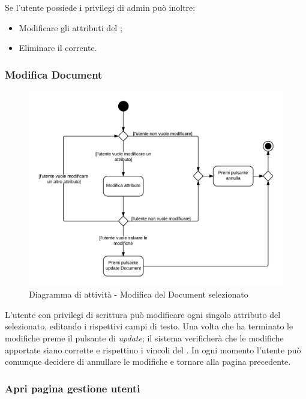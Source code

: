 Se l'utente possiede i privilegi di admin può inoltre:

\begin{itemize}

	\item Modificare gli attributi del ;
	\item Eliminare il  corrente.

\end{itemize}

\subsubsection{Modifica Document}

\begin{figure}[H]
\centering
\includegraphics[scale=0.2]{uml/attivita/MaaP - Modifica document.png}
\caption{Diagramma di attività - Modifica del Document selezionato}
\end{figure}

L'utente con privilegi di scrittura può modificare ogni singolo attributo del  selezionato, editando i rispettivi campi di testo. Una volta che ha terminato le modifiche preme il pulsante di \textit{update}; il sistema  verificherà che le modifiche apportate siano corrette e rispettino i vincoli del . In ogni momento l'utente può comunque decidere di annullare le modifiche e tornare alla pagina precedente.

\subsubsection{Apri pagina gestione utenti}

